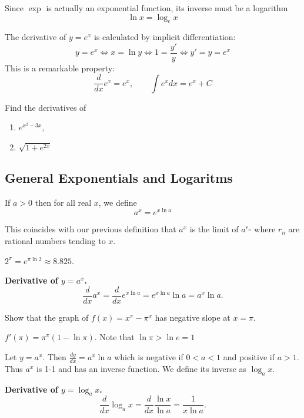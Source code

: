 \documentclass[calc1-main.tex]{subfiles}
\begin{document}

  Since $\exp$ is actually an exponential function, its inverse must be a logarithm
  \[
    \ln x = \log_e x
  \]

  The derivative of $y = e^x$ is calculated by implicit differentiation:
  \[
    y = e^x \iff
    x = \ln y \iff
    1 = \frac{y'}{y} \iff
    y' = y = e^x
  \]
  This is a remarkable property:
  \[
    \frac{d}{dx} e^x = e^x, \qquad \int e^x dx = e^x + C
  \]

  \begin{example}
    Find the derivatives of
    \begin{enumerate}
      \item $e^{x^2-3x}$,
      \item $\sqrt{1+e^{2x}}$
    \end{enumerate}
  \end{example}

  \subsection*{General Exponentials and Logaritms}
  \begin{definition}
    If $a>0$ then for all real $x$, we define
    \[
      a^x = e^{x \ln a}
    \]
  \end{definition}
  This coincides with our previous definition that $a^x$ is the limit of $a^{r_n}$ where $r_n$ are rational numbers tending to $x$.

  \begin{example}
    $2^{\pi} = e^{\pi \ln 2} \approx 8.825$.
  \end{example}

  \textbf{Derivative of $y=a^x$.}
  \[
    \frac{d}{dx} a^x = \frac{d}{dx} e^{x \ln a} = e^{x \ln a} \ln a = a^x \ln a.
  \]

  \begin{example}
    Show that the graph of $f(x) = x^{\pi} - \pi^x$ has negative slope at $x = \pi$.
  \end{example}
  \begin{solution}
    $f'(\pi) = \pi^{\pi} (1- \ln \pi)$. Note that $\ln \pi > \ln e = 1$
  \end{solution}

  \begin{definition}
    Let $y = a^x$. Then $\frac{dy}{dx} = a^x \ln a$ which is negative if $0<a<1$ and positive if $a>1$. Thus $a^x$ is 1-1 and has an inverse function. We define its inverse as $\log_a x$.
  \end{definition}
  \textbf{Derivative of $y=\log_a x$.}
  \[
    \frac{d}{dx} \log_a x = \frac{d}{dx} \frac{\ln x}{\ln a} = \frac{1}{x \ln a}.
  \]
\end{document}
